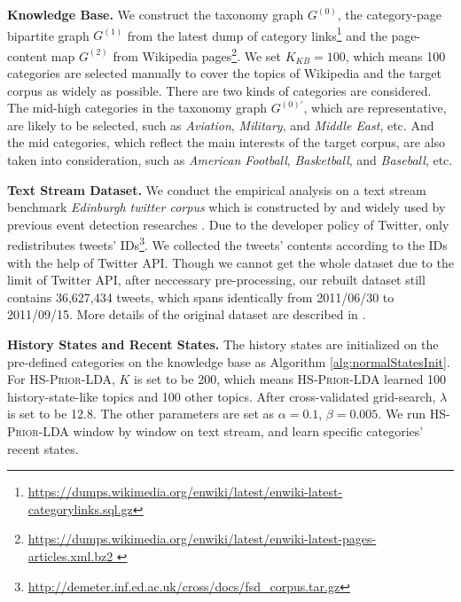 \documentclass{article}
\begin{document}
\textbf{Knowledge Base.} 
We construct the taxonomy graph \(G^{(0)}\), the category-page bipartite graph \(G^{(1)}\) from the latest dump of category links\footnote{\url{https://dumps.wikimedia.org/enwiki/latest/enwiki-latest-categorylinks.sql.gz}} and the page-content map \(G^{(2)}\) from Wikipedia pages\footnote{\url{https://dumps.wikimedia.org/enwiki/latest/enwiki-latest-pages-articles.xml.bz2 }}.
We set \(K_{KB}=100\), which means 100 categories are selected manually to cover the topics of Wikipedia and the target corpus as widely as possible. 
There are two kinds of categories are considered. 
The mid-high categories in the taxonomy graph \(G^{(0)'}\), which are representative, are likely to be selected, such as \textit{Aviation}, \textit{Military}, and \textit{Middle East}, etc.
And the mid categories, which reflect the main interests of the target corpus, are also taken into consideration, such as \textit{American Football}, \textit{Basketball}, and \textit{Baseball}, etc. 

\textbf{Text Stream Dataset.} We conduct the empirical analysis on a text stream benchmark \textit{Edinburgh twitter corpus} which is constructed by \cite{petrovic2012using} and widely used by previous event detection researches \cite{petrovic2013can} \cite{Wurzer:2015wq}. 
Due to the developer policy of Twitter, \cite{petrovic2012using} only redistributes tweets' IDs\footnote{\url{http://demeter.inf.ed.ac.uk/cross/docs/fsd_corpus.tar.gz}}.
We collected the tweets' contents according to the IDs with the help of Twitter API. 
Though we cannot get the whole dataset due to the limit of Twitter API, after neccessary pre-processing, our rebuilt dataset still contains 36,627,434 tweets, which spans identically from 2011/06/30 to 2011/09/15.
More details of the original dataset are described in \cite{petrovic2010edinburgh}.

\textbf{History States and Recent States.} 
The history states are initialized on the pre-defined categories on the knowledge base as Algorithm \ref{alg:normalStatesInit}.
For \textsc{HS-Prior-LDA}, \(K\) is set to be 200, which means \textsc{HS-Prior-LDA} learned 100 history-state-like topics and 100 other topics.
After cross-validated grid-search, \(\lambda\) is set to be 12.8. The other parameters are set as \(\alpha=0.1\), \(\beta=0.005\).
We run \textsc{HS-Prior-LDA} window by window on text stream, and learn specific categories' recent states.
\end{document}
